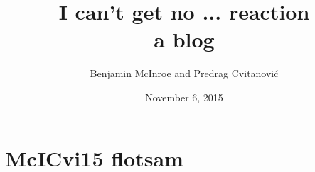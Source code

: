 \documentclass[10pt,openany]{book}
\begin{document}
        \date{November 6, 2015} \Private{\date{\today}}

\title{ 			I can't get no ... reaction
       \\ \Huge 	a blog
        \\\vspace{1.0cm}
        }\author{
		Benjamin McInroe
         and
        Predrag Cvitanovi\'{c}
        }

%
\maketitle

\thispagestyle{empty}
\tableofcontents

\chapter{McICvi15 flotsam}
\label{s:flotsam}


\newpage
\printbibliography
%


\end{document}
